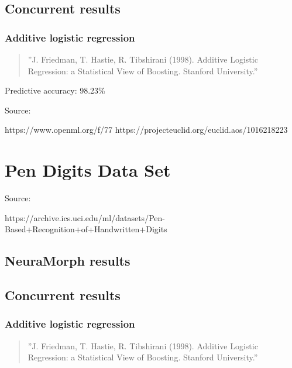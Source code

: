 \documentclass[8pt, a4paper]{article}
\begin{document}


\subsection{Concurrent results}

\subsubsection{Additive logistic regression}

\begin{quote}
''J. Friedman, T. Hastie, R. Tibshirani (1998). Additive Logistic Regression: a Statistical View of Boosting. Stanford University.''
\end{quote}

Predictive accuracy: 98.23\%

Source:

https://www.openml.org/f/77
https://projecteuclid.org/euclid.aos/1016218223






\newpage
\section{Pen Digits Data Set}

Source: 

https://archive.ics.uci.edu/ml/datasets/Pen-Based+Recognition+of+Handwritten+Digits

\subsection{NeuraMorph results}



\subsection{Concurrent results}

\subsubsection{Additive logistic regression}

\begin{quote}
''J. Friedman, T. Hastie, R. Tibshirani (1998). Additive Logistic Regression: a Statistical View of Boosting. Stanford University.''
\end{quote}
\end{document}
